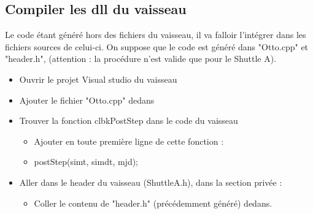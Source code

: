 \documentclass[a4paper,11pt]{article}
\begin{document}
\subsection{Compiler les dll du vaisseau}

Le code étant généré hors des fichiers du vaisseau, il va falloir l'intégrer dans les fichiers sources de celui-ci.
On suppose que le code est généré dans "Otto.cpp" et "header.h", (attention : la procédure n'est valide que pour le Shuttle A).\newline
\begin{itemize}
	\item Ouvrir le projet Visual studio du vaisseau
	\item Ajouter le fichier "Otto.cpp" dedans
	\item Trouver la fonction clbkPostStep dans le code du vaisseau
	\begin{itemize}
		\item Ajouter en toute première ligne de cette fonction : 
		\item postStep(simt, simdt, mjd);
	\end{itemize}
	\item Aller dans le header du vaisseau (ShuttleA.h), dans la section privée :
	\begin{itemize}
		\item Coller le contenu de "header.h" (précédemment généré) dedans.
	\end{itemize}
	
\end{itemize}
\end{document}
